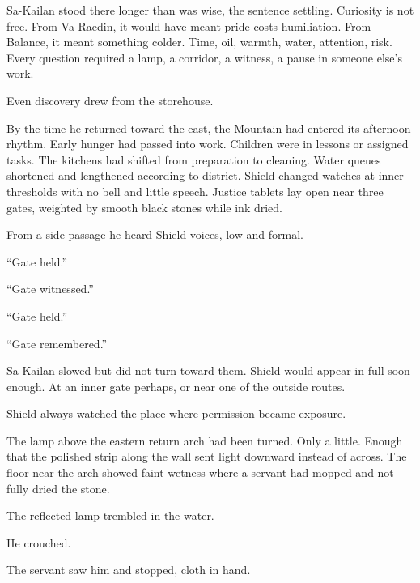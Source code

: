 Sa-Kailan stood there longer than was wise, the sentence settling.
Curiosity is not free.
From Va-Raedin, it would have meant pride costs humiliation.
From Balance, it meant something colder.
Time, oil, warmth, water, attention, risk.
Every question required a lamp, a corridor, a witness, a pause in someone else’s work.\par

Even discovery drew from the storehouse.\par

By the time he returned toward the east, the Mountain had entered its afternoon rhythm.
Early hunger had passed into work.
Children were in lessons or assigned tasks.
The kitchens had shifted from preparation to cleaning.
Water queues shortened and lengthened according to district.
Shield changed watches at inner thresholds with no bell and little speech.
Justice tablets lay open near three gates, weighted by smooth black stones while ink dried.\par

From a side passage he heard Shield voices, low and formal.\par

“Gate held.”\par

“Gate witnessed.”\par

“Gate held.”\par

“Gate remembered.”\par

Sa-Kailan slowed but did not turn toward them.
Shield would appear in full soon enough.
At an inner gate perhaps, or near one of the outside routes.\par

Shield always watched the place where permission became exposure.\par

The lamp above the eastern return arch had been turned.
Only a little.
Enough that the polished strip along the wall sent light downward instead of across.
The floor near the arch showed faint wetness where a servant had mopped and not fully dried the stone.\par

The reflected lamp trembled in the water.\par

He crouched.\par

The servant saw him and stopped, cloth in hand.\par

